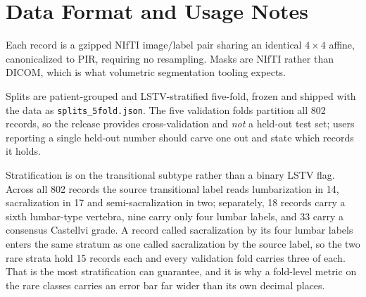 \documentclass[aapm,mph,amsmath,amssymb,reprint]{revtex4-2}
\begin{document}
\section{Data Format and Usage Notes}\label{sec:format}

Each record is a gzipped NIfTI image/label pair sharing an identical $4\times4$ affine,
canonicalized to PIR, requiring no resampling. Masks are NIfTI rather than DICOM, which is what volumetric segmentation tooling expects.

Splits are patient-grouped and LSTV-stratified five-fold, frozen and shipped with the data
as \texttt{splits\_5fold.json}. The five validation folds partition all 802 records, so the
release provides cross-validation and \emph{not} a held-out test set; users reporting a
single held-out number should carve one out and state which records it holds.

Stratification is on the transitional subtype rather than a binary LSTV flag. Across all
802 records the source transitional label reads lumbarization in 14, sacralization in 17
and semi-sacralization in two; separately, 18 records carry a sixth lumbar-type vertebra,
nine carry only four lumbar labels, and 33 carry a consensus Castellvi grade. A record
called sacralization by its four lumbar labels enters the same stratum as one called
sacralization by the source label, so the two rare strata hold 15 records each and every
validation fold carries three of each. That is the most stratification can guarantee, and
it is why a fold-level metric on the rare classes carries an error bar far wider than its
own decimal places.
\end{document}
